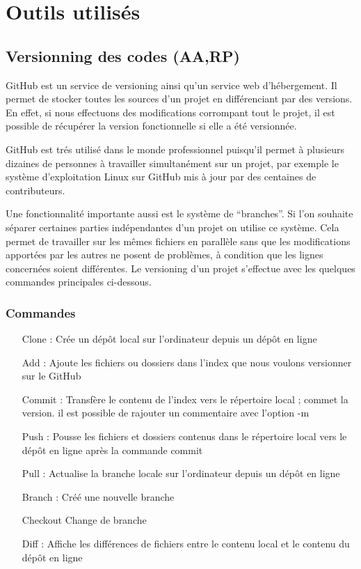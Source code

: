 \clearpage

\section{Outils utilisés}

\subsection{Versionning des codes (AA,RP)}

GitHub est un service de versioning ainsi qu’un service web d’hébergement. Il permet de
stocker toutes les sources d’un projet en différenciant par des versions. En effet, si nous
effectuons des modifications corrompant tout le projet, il est possible de récupérer la
version fonctionnelle si elle a été versionnée. \medskip

GitHub est trés utilisé dans le monde professionnel puisqu’il permet à plusieurs dizaines
de personnes à travailler simultanément sur un projet, par exemple le système
d’exploitation Linux sur GitHub mis à jour par des centaines de contributeurs. \medskip

Une fonctionnalité importante aussi est le système de “branches”. Si l’on souhaite séparer
certaines parties indépendantes d’un projet on utilise ce système. Cela permet de travailler
sur les mêmes fichiers en parallèle sans que les modifications apportées par les autres ne
posent de problèmes, à condition que les lignes concernées soient différentes. Le
versioning d’un projet s’effectue avec les quelques commandes principales ci-dessous.

\subsubsection{Commandes}

\begin{itemize}
    \item[Clone : ] Crée un dépôt local sur l’ordinateur depuis un dépôt en ligne
    \item[Add : ] Ajoute les fichiers ou dossiers dans l’index que nous voulons versionner sur le
    GitHub
    \item[Commit : ] Transfère le contenu de l’index vers le répertoire local ; commet la version. il est
    possible de rajouter un commentaire avec l’option -m
    \item[Push : ] Pousse les fichiers et dossiers contenus dans le répertoire local vers le dépôt en
    ligne après la commande commit
    \item[Pull : ] Actualise la branche locale sur l’ordinateur depuis un dépôt en ligne
    \item[Branch : ] Créé une nouvelle branche
    \item[Checkout ] Change de branche
    \item[Diff : ] Affiche les différences de fichiers entre le contenu local et le contenu du dépôt en
    ligne
\end{itemize}

